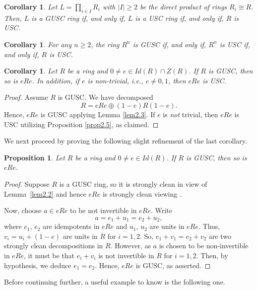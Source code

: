 \documentclass[12pt]{amsart}
\newtheorem{proposition}[theorem]{Proposition}
\newtheorem{corollary}[theorem]{Corollary}
\theoremstyle{definition}
\begin{document}
\begin{corollary}
Let $L=\prod_{i \in I} R_i$ with $|I| \geq 2$ be the direct product of rings $R_i \cong R$. Then, $L$ is a GUSC ring if, and only if, $L$ is a USC ring if, and only if, $R$ is USC.
\end{corollary}

\begin{corollary}
For any $n \geq 2$, the ring $R^n$ is GUSC if, and only if, $R^n$ is USC if, and only if, $R$ is USC.
\end{corollary}

\begin{corollary}\label{cor2.6}
Let $R$ be a ring and $0\neq e \in Id(R)\cap Z(R)$. If $R$ is GUSC, then so is $eRe$. In addition, if $e$ is non-trivial, i.e., $e\not= 0,1$, then $eRe$ is USC.
\end{corollary}

\begin{proof}
Assume $R$ is GUSC. We have decomposed $$R=eRe \oplus (1-e)R(1-e).$$ Hence, $eRe$ is GUSC applying Lemma \ref{lem2.3}. If $e$ is {\it not} trivial, then $eRe$ is USC utilizing Proposition \ref{prop2.5}, as claimed.
\end{proof}

We next proceed by proving the following slight refinement of the last corollary.

\begin{proposition}\label{1}
Let $R$ be a ring and $0\neq e \in Id(R)$. If $R$ is GUSC, then so is $eRe$.
\end{proposition}

\begin{proof}
Suppose $R$ is a GUSC ring, so it is strongly clean in view of Lemma~\ref{lem2.2} and hence $eRe$ is strongly clean viewing \cite[Theorem 1.1.12]{13}.

Now, choose $a \in eRe$ to be not invertible in $eRe$. Write $$a=e_{1}+u_{1}=e_{2}+u_{2},$$ where $e_{1}$, $e_{2}$ are idempotents in $eRe$ and $u_{1}$, $u_{2}$ are units in $eRe$. Thus, $v_{i}=u_{i}+(1-e)$ are units in $R$ for $i=1,2$. So, $e_{1}+v_{1}=e_{2}+v_{2}$ are two strongly clean decompositions in $R$. However, as $a$ is chosen to be non-invertible in $eRe$, it must be that $e_{i}+v_{i}$ is not invertible in $R$ for $i=1,2$. Then, by hypothesis, we deduce $e_{1}=e_{2}$. Hence, $eRe$ is GUSC, as asserted.  	
\end{proof}	

Before continuing further, a useful example to know is the following one.
\end{document}
